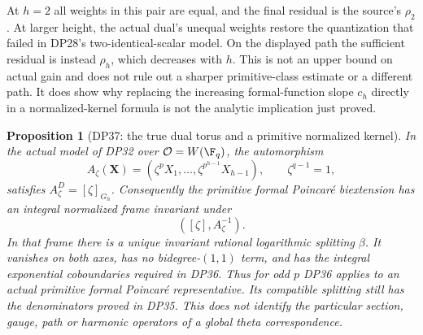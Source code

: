\documentclass[11pt,a4paper]{article}
\newtheorem{proposition}[theorem]{Proposition}
\theoremstyle{definition}\newtheorem{remark}[theorem]{Remark}
\begin{document}
At $h=2$ all weights in this pair are equal, and the final residual is the source's $\rho_2$. At larger height, the actual dual's unequal weights restore the quantization that failed in DP28's two-identical-scalar model. On the displayed path the sufficient residual is instead $\rho_h$, which decreases with $h$. This is not an upper bound on actual gain and does not rule out a sharper primitive-class estimate or a different path. It does show why replacing the increasing formal-function slope $c_h$ directly in a normalized-kernel formula is not the analytic implication just proved.

\begin{proposition}[DP37: the true dual torus and a primitive normalized kernel]\label{DP37}
In the actual model of DP32 over $\mathcal O=W(\F_q)$, the automorphism
\[
 A_\zeta(\mathbf X)=(\zeta^pX_1,\ldots,\zeta^{p^{h-1}}X_{h-1}),\qquad\zeta^{q-1}=1,
\]
satisfies $A_\zeta^D=[\zeta]_{G_h}$. Consequently the primitive formal Poincar\'e biextension has an integral normalized frame invariant under
\[
 ([\zeta],A_\zeta^{-1}).
\]
In that frame there is a unique invariant rational logarithmic splitting $\beta$. It vanishes on both axes, has no bidegree-$(1,1)$ term, and has the integral exponential coboundaries required in DP36. Thus for odd $p$ DP36 applies to an actual primitive formal Poincar\'e representative. Its compatible splitting still has the denominators proved in DP35. This does not identify the particular section, gauge, path or harmonic operators of a global theta correspondence.
\end{proposition}
\end{document}
